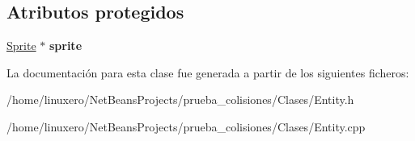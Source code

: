 \subsection*{Atributos protegidos}
\begin{DoxyCompactItemize}
\item 
\hypertarget{classEntity_a4da30cea569f19c66c033358e1e99c04}{\hyperlink{classSprite}{Sprite} $\ast$ {\bfseries sprite}}\label{classEntity_a4da30cea569f19c66c033358e1e99c04}

\end{DoxyCompactItemize}


La documentación para esta clase fue generada a partir de los siguientes ficheros\-:\begin{DoxyCompactItemize}
\item 
/home/linuxero/\-Net\-Beans\-Projects/prueba\-\_\-colisiones/\-Clases/Entity.\-h\item 
/home/linuxero/\-Net\-Beans\-Projects/prueba\-\_\-colisiones/\-Clases/Entity.\-cpp\end{DoxyCompactItemize}
